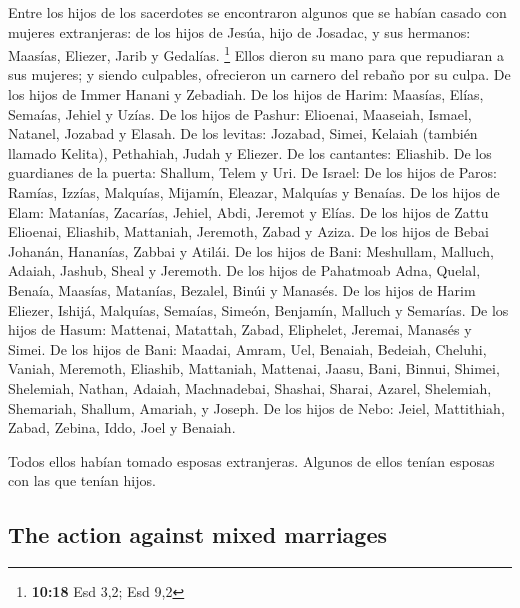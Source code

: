 \begin{paracol}{2}
 Entre los hijos de los sacerdotes se encontraron algunos
que se habían casado con mujeres extranjeras: de los hijos de Jesúa,
hijo de Josadac, y sus hermanos: Maasías, Eliezer, Jarib y Gedalías.
\footnote{\textbf{10:18} Esd 3,2; Esd 9,2}  Ellos dieron
su mano para que repudiaran a sus mujeres; y siendo culpables,
ofrecieron un carnero del rebaño por su culpa.  De los
hijos de Immer Hanani y Zebadiah.  De los hijos de Harim:
Maasías, Elías, Semaías, Jehiel y Uzías.  De los hijos de
Pashur: Elioenai, Maaseiah, Ismael, Natanel, Jozabad y Elasah.
 De los levitas: Jozabad, Simei, Kelaiah (también llamado
Kelita), Pethahiah, Judah y Eliezer.  De los cantantes:
Eliashib. De los guardianes de la puerta: Shallum, Telem y Uri.
 De Israel: De los hijos de Paros: Ramías, Izzías,
Malquías, Mijamín, Eleazar, Malquías y Benaías.  De los
hijos de Elam: Matanías, Zacarías, Jehiel, Abdi, Jeremot y Elías.
 De los hijos de Zattu Elioenai, Eliashib, Mattaniah,
Jeremoth, Zabad y Aziza.  De los hijos de Bebai Johanán,
Hananías, Zabbai y Atilái.  De los hijos de Bani:
Meshullam, Malluch, Adaiah, Jashub, Sheal y Jeremoth.  De
los hijos de Pahatmoab Adna, Quelal, Benaía, Maasías, Matanías, Bezalel,
Binúi y Manasés.  De los hijos de Harim Eliezer, Ishijá,
Malquías, Semaías, Simeón,  Benjamín, Malluch y Semarías.
 De los hijos de Hasum: Mattenai, Matattah, Zabad,
Eliphelet, Jeremai, Manasés y Simei.  De los hijos de
Bani: Maadai, Amram, Uel,  Benaiah, Bedeiah, Cheluhi,
 Vaniah, Meremoth, Eliashib,  Mattaniah,
Mattenai, Jaasu,  Bani, Binnui, Shimei, 
Shelemiah, Nathan, Adaiah,  Machnadebai, Shashai, Sharai,
 Azarel, Shelemiah, Shemariah,  Shallum,
Amariah, y Joseph.  De los hijos de Nebo: Jeiel,
Mattithiah, Zabad, Zebina, Iddo, Joel y Benaiah.

 Todos ellos habían tomado esposas extranjeras. Algunos
de ellos tenían esposas con las que tenían hijos. \switchcolumn
\begin{otherlanguage}{english}

\hypertarget{the-action-against-mixed-marriages}{%
\subsection{The action against mixed
marriages}\label{the-action-against-mixed-marriages}}


\end{otherlanguage}
\end{paracol}

